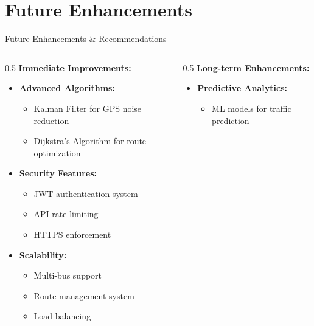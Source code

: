 \documentclass[aspectratio=169]{beamer}
\begin{document}
\section{Future Enhancements}

\begin{frame}{Future Enhancements \& Recommendations}
    \begin{columns}
        \begin{column}{0.5\textwidth}
            \textbf{Immediate Improvements:}
            \begin{itemize}
                \item \textbf{Advanced Algorithms:}
                    \begin{itemize}
                        \item Kalman Filter for GPS noise reduction
                        \item Dijkstra's Algorithm for route optimization
                    \end{itemize}
                \item \textbf{Security Features:}
                    \begin{itemize}
                        \item JWT authentication system
                        \item API rate limiting
                        \item HTTPS enforcement
                    \end{itemize}
                \item \textbf{Scalability:}
                    \begin{itemize}
                        \item Multi-bus support
                        \item Route management system
                        \item Load balancing
                    \end{itemize}
            \end{itemize}
        \end{column}
        \begin{column}{0.5\textwidth}
            \textbf{Long-term Enhancements:}
            \begin{itemize}
                \item \textbf{Predictive Analytics:}
                    \begin{itemize}
                        \item ML models for traffic prediction

\end{itemize}
\end{itemize}
\end{column}
\end{columns}
\end{frame}
\end{document}

